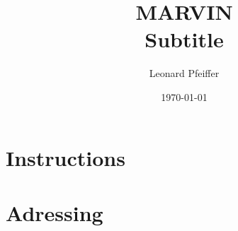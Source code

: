 \documentclass[11pt]{article}
\title{
	\huge MARVIN \\
	\vspace{7pt}
	\Large Subtitle
}
\author{Leonard Pfeiffer}
\date{\today}
\begin{document}
	\maketitle \label{title}
	\newpage
	
	\tableofcontents \label{toc}
	\newpage

    \section{Instructions}

    \section{Adressing}
\end{document}
